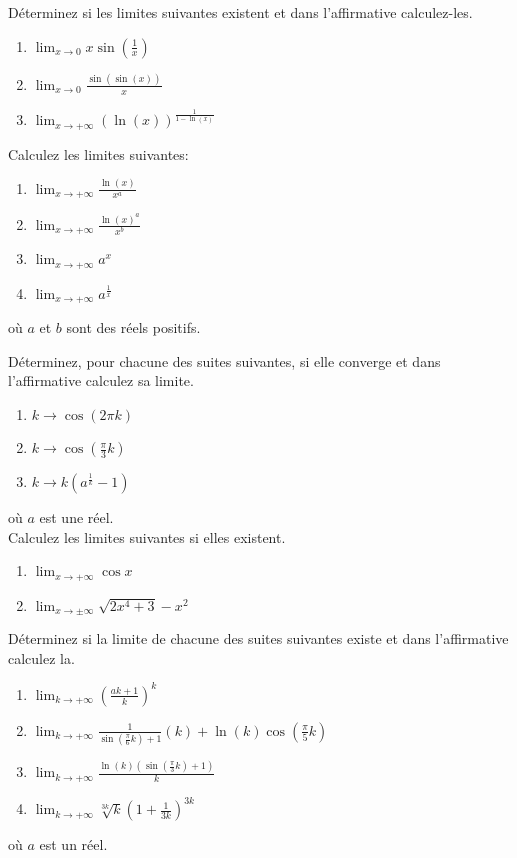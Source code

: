 \exerNico Déterminez si les limites suivantes existent et dans
l'affirmative calculez-les.
\begin{enumerate}
\item $  \lim_{x \rightarrow  0} x \sin(\frac{1}{x}) $
\item $  \lim_{x \rightarrow  0} \frac{\sin(\sin(x))}{x} $
\item $  \lim_{x \rightarrow  +\infty} (\ln(x))^\frac{1}{1 - \ln(x)}$
\end{enumerate}

\exerNico Calculez les limites suivantes:
\begin{enumerate}
\item $  \lim_{x \rightarrow  +\infty} \frac{\ln(x)}{x ^a} $
\item $  \lim_{x \rightarrow  +\infty} \frac{\ln(x)^a}{x ^b} $
\item $  \lim_{x \rightarrow  +\infty} a ^x $
\item $  \lim_{x \rightarrow  +\infty} a ^\frac{1}{x} $
\end{enumerate}
où $a$ et $b$ sont des réels positifs.
%

%

\exerNico Déterminez, pour chacune des suites suivantes, si elle converge
et dans l'affirmative calculez sa limite.
\begin{enumerate}
\item $  k \rightarrow  \cos( 2 \pi k) $
\item $  k \rightarrow  \cos(\frac{\pi}{3} k) $
\item $  k \rightarrow  k(a ^\frac{1}{k} -1 ) $
\end{enumerate}
où $a$ est une réel.\\



\exerNico Calculez  les limites suivantes si elles existent.
\begin{enumerate}
\item $  \lim_{x \rightarrow  +\infty} \cos x $
\item $  \lim_{x \rightarrow  \pm \infty }\sqrt{2x^4+3}-x^2 $

\end{enumerate}

\exerNico Déterminez si la limite de chacune des suites suivantes
existe et dans l'affirmative calculez la.
\begin{enumerate}
\item $  \lim_{k \rightarrow  +\infty }(\frac{a k +1}{k})^k $
\item $  \lim_{k \rightarrow  +\infty}\frac{1}{\sin(\frac{\pi}{6}k)+1}(k) + \ln(k)\cos(\frac{\pi}{5}k)$
\item $  \lim_{k \rightarrow  +\infty} \frac{\ln(k)(\sin(\frac{\pi}{3}k) +1)}{k} $
\item $  \lim_{k \rightarrow  +\infty } \sqrt[3k]{k} (1 +
\frac{1}{3k})^{3k} $
\end{enumerate}
où $a$ est un réel.

